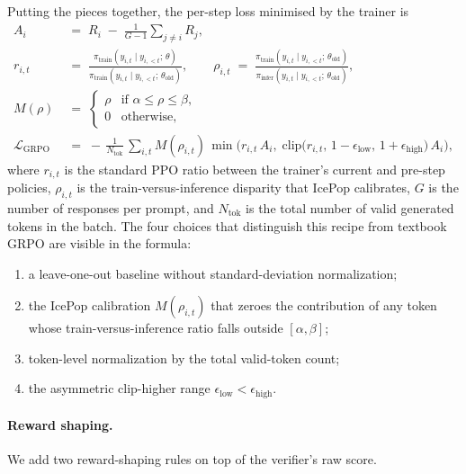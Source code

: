 \documentclass{llmxive}
\begin{document}
Putting the pieces together, the per-step loss minimised by the trainer
is
\begin{equation*}
\begin{aligned}
A_i \;&=\; R_i \;-\; \frac{1}{G-1}\sum_{j \neq i} R_j, \\[2pt]
r_{i,t} \;&=\; \frac{\pi_\text{train}(y_{i,t} \mid y_{i,<t};\, \theta)}
                    {\pi_\text{train}(y_{i,t} \mid y_{i,<t};\, \theta_\text{old})},
\qquad
\rho_{i,t} \;=\; \frac{\pi_\text{train}(y_{i,t} \mid y_{i,<t};\, \theta_\text{old})}
                       {\pi_\text{infer}(y_{i,t} \mid y_{i,<t};\, \theta_\text{old})}, \\[4pt]
M(\rho) \;&=\;
\begin{cases}
\rho & \text{if } \alpha \le \rho \le \beta, \\
0 & \text{otherwise,}
\end{cases} \\[4pt]
\mathcal{L}_\text{GRPO}
\;&=\;
-\,\frac{1}{N_\text{tok}}\,
\sum_{i,t}
M(\rho_{i,t})\,
\min\!\Big(
r_{i,t}\, A_i,\;
\mathrm{clip}\!\big(r_{i,t},\, 1 - \epsilon_\text{low},\, 1 + \epsilon_\text{high}\big)\, A_i
\Big),
\end{aligned}
\end{equation*}
where $r_{i,t}$ is the standard PPO ratio between the trainer's current
and pre-step policies, $\rho_{i,t}$ is the train-versus-inference
disparity that IcePop calibrates, $G$ is the number of responses per
prompt, and $N_\text{tok}$ is the total number of valid generated tokens
in the batch. The four choices that distinguish this recipe from
textbook GRPO are visible in the formula:
\begin{enumerate}
  \item a leave-one-out baseline without standard-deviation
    normalization;
  \item the IcePop calibration $M(\rho_{i,t})$ that zeroes the
    contribution of any token whose train-versus-inference ratio falls
    outside $[\alpha, \beta]$;
  \item token-level normalization by the total valid-token count;
  \item the asymmetric clip-higher range
    $\epsilon_\text{low} < \epsilon_\text{high}$.
\end{enumerate}

\paragraph{Reward shaping.}
We add two reward-shaping rules on top of the verifier's raw score.
\end{document}
